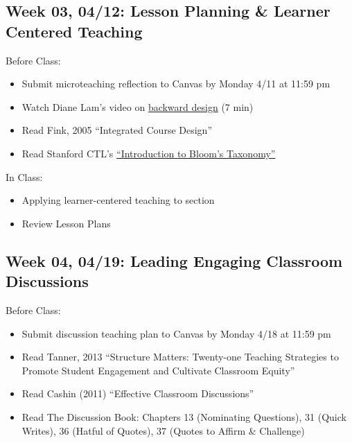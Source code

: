 \documentclass[11pt,]{article}
\providecommand{\tightlist}{%
  \setlength{\itemsep}{0pt}\setlength{\parskip}{0pt}}
\begin{document}
\hypertarget{week-03-0412-lesson-planning-learner-centered-teaching}{%
\subsection{Week 03, 04/12: Lesson Planning \& Learner Centered
Teaching}\label{week-03-0412-lesson-planning-learner-centered-teaching}}

Before Class:

\begin{itemize}
\tightlist
\item
  Submit microteaching reflection to Canvas by Monday 4/11 at 11:59 pm
\item
  Watch Diane Lam's video on
  \href{https://stanford.zoom.us/rec/play/Lcfmo1wLFLgZXNdYgthaLDMGDxFuDHKu7Xq1CLIHKmMsKzjnUNZhQuJI91SRpCD9OPrw7TvDLw5osudx.5MVRl6P7_tsvtEBm?startTime=1592259933000\&_x_zm_rtaid=NLWZrE4PQqGaigDIkeAlkg.1614367820420.cd397df1d9e6e93f88fe84cb458cbea4\&_x_zm_rhtaid=726}{backward
  design} (7 min)
\item
  Read Fink, 2005 ``Integrated Course Design''
\item
  Read Stanford CTL's
  \href{https://docs.google.com/document/d/1NNQvCTwHfdX7r-z4axdWnzlGy5LYw9ZIvvWQas1aJYE/edit?usp=sharing}{``Introduction
  to Bloom's Taxonomy''}
\end{itemize}

In Class:

\begin{itemize}
\tightlist
\item
  Applying learner-centered teaching to section
\item
  Review Lesson Plans
\end{itemize}

\hypertarget{week-04-0419-leading-engaging-classroom-discussions}{%
\subsection{Week 04, 04/19: Leading Engaging Classroom
Discussions}\label{week-04-0419-leading-engaging-classroom-discussions}}

Before Class:

\begin{itemize}
\tightlist
\item
  Submit discussion teaching plan to Canvas by Monday 4/18 at 11:59 pm
\item
  Read Tanner, 2013 ``Structure Matters: Twenty-one Teaching Strategies
  to Promote Student Engagement and Cultivate Classroom Equity''
\item
  Read Cashin (2011) ``Effective Classroom Discussions''
\item
  Read The Discussion Book: Chapters 13 (Nominating Questions), 31
  (Quick Writes), 36 (Hatful of Quotes), 37 (Quotes to Affirm \&
  Challenge)
\end{itemize}
\end{document}

